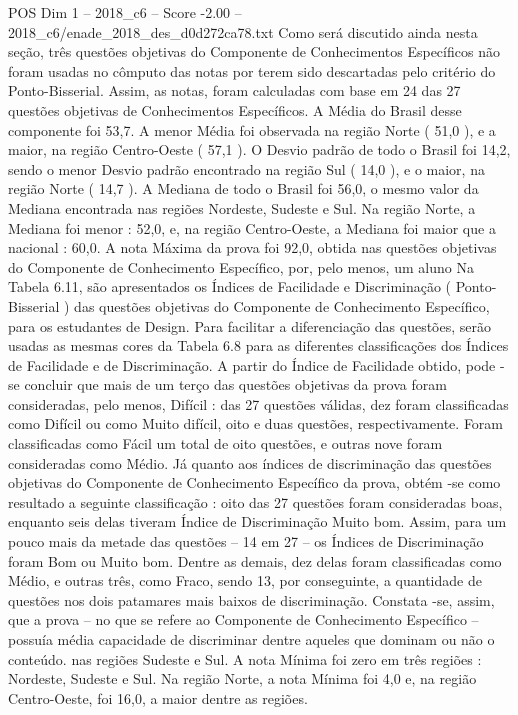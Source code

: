 \begin{textsample}{POS Dim 1 – 2018\_c6 – Score -2.00 – 2018\_c6/enade\_2018\_des\_d0d272ca78.txt}
Como será discutido ainda nesta seção, três questões objetivas do Componente de Conhecimentos Específicos não foram usadas no cômputo das notas por terem sido descartadas pelo critério do Ponto-Bisserial.
Assim, as notas, foram calculadas com base em 24 das 27 questões objetivas de Conhecimentos Específicos.
A Média do Brasil desse componente foi 53,7.
A menor Média foi observada na região Norte ( 51,0 ), e a maior, na região Centro-Oeste ( 57,1 ).
O Desvio padrão de todo o Brasil foi 14,2, sendo o menor Desvio padrão encontrado na região Sul ( 14,0 ), e o maior, na região Norte ( 14,7 ).
A Mediana de todo o Brasil foi 56,0, o mesmo valor da Mediana encontrada nas regiões Nordeste, Sudeste e Sul.
Na região Norte, a Mediana foi menor : 52,0, e, na região Centro-Oeste, a Mediana foi maior que a nacional : 60,0.
A nota Máxima da prova foi 92,0, obtida nas questões objetivas do Componente de Conhecimento Específico, por, pelo menos, um aluno Na Tabela 6.11, são apresentados os Índices de Facilidade e Discriminação ( Ponto-Bisserial ) das questões objetivas do Componente de Conhecimento Específico, para os estudantes de Design.
Para facilitar a diferenciação das questões, serão usadas as mesmas cores da Tabela 6.8 para as diferentes classificações dos Índices de Facilidade e de Discriminação.
A partir do Índice de Facilidade obtido, pode -se concluir que mais de um terço das questões objetivas da prova foram consideradas, pelo menos, Difícil : das 27 questões válidas, dez foram classificadas como Difícil ou como Muito difícil, oito e duas questões, respectivamente.
Foram classificadas como Fácil um total de oito questões, e outras nove foram consideradas como Médio.
Já quanto aos índices de discriminação das questões objetivas do Componente de Conhecimento Específico da prova, obtém -se como resultado a seguinte classificação : oito das 27 questões foram consideradas boas, enquanto seis delas tiveram Índice de Discriminação Muito bom.
Assim, para um pouco mais da metade das questões – 14 em 27 – os Índices de Discriminação foram Bom ou Muito bom.
Dentre as demais, dez delas foram classificadas como Médio, e outras três, como Fraco, sendo 13, por conseguinte, a quantidade de questões nos dois patamares mais baixos de discriminação.
Constata -se, assim, que a prova – no que se refere ao Componente de Conhecimento Específico – possuía média capacidade de discriminar dentre aqueles que dominam ou não o conteúdo. nas regiões Sudeste e Sul.
A nota Mínima foi zero em três regiões : Nordeste, Sudeste e Sul.
Na região Norte, a nota Mínima foi 4,0 e, na região Centro-Oeste, foi 16,0, a maior dentre as regiões.

\end{textsample}

